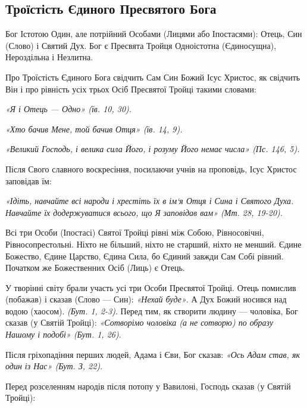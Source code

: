 \documentclass[main.tex]{subfiles}
\begin{document}
\subsection{Троїстість Єдиного Пресвятого Бога}

Бог Істотою Один, але потрійний Особами (Лицями або Іпостасями): Отець, Син (Слово) і Святий Дух. Бог є Пресвята Тройця Одноістотна (Єдиносущна), Нероздільна і Незлитна.

Про Троїстість Єдиного Бога свідчить Сам Син Божий Ісус Христос, як свідчить Він і про рівність усіх трьох Осіб Пресвятої Тройці такими словами:

\begin{FlushRight}
    \emph{{\color{red} «Я і Отець — Одно»} (їв. 10, 30).}
    
    \emph{{\color{red} «Хто бачив Мене, той бачив Отця»} (їв. 14, 9).}
\end{FlushRight}

\begin{FlushRight}
    \emph{«Великий Господь, і велика сила Його, і розуму Його немає числа» (Пс. 146, 5).}
\end{FlushRight}

Після Свого славного воскресіння, посилаючи учнів на проповідь, Ісус Христос заповідав їм:

\begin{FlushRight}
    \emph{{\color{red} «Ідіть, навчайте всі народи і хрестіть їх в ім`я Отця і Сина і Святого Духа. Навчайте їх додержуватися всього, що Я заповідав вам»} (Мт. 28, 19-20).}
\end{FlushRight}

Всі три Особи (Іпостасі) Святої Тройці рівні між Собою, Рівносовічні, Рівносопрестольні. Ніхто не більший, ніхто не старший, ніхто не менший. Єдине Божество, Єдине Царство, Єдина Сила, бо Єдиний завжди Сам Собі рівний. Початком же Божественних Осіб (Лиць) є Отець.

У творінні світу брали участь усі три Особи Пресвятої Тройці. Отець помислив (побажав) і сказав (Слово — Син): \emph{«Нехай буде»}. А Дух Божий носився над водою (хаосом). \emph{(Бут. 1, 2-3)}.
Перед тим, як створити людину — чоловіка, Бог сказав (у Святій Тройці): \emph{{\color{red} «Сотворімо чоловіка (а не сотворю) по образу Нашому і подобі»} (Бут. 1, 26)}.

Після гріхопадіння перших людей, Адама і Єви, Бог сказав: \emph{{\color{red} «Ось Адам став, як один із Нас»} (Бут. З, 22)}.

Перед розселенням народів після потопу у Вавилоні, Господь сказав (у Святій Тройці):
\end{document}
